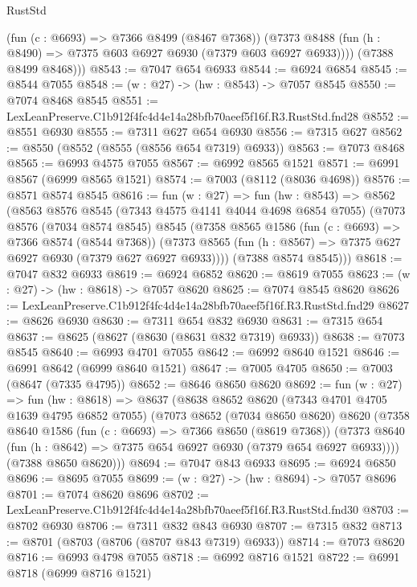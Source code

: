 \begin{lexlean}{RustStd}
\begin{coremodule}
          (fun (c : @6693) => @7366 @8499 (@8467 @7368))
          (@7373 @8488 (fun (h : @8490) => @7375 @603 @6927 @6930 (@7379 @603 @6927 @6933))))
        (@7388 @8499 @8468)))
@8543 := @7047 @654 @6933
@8544 := @6924 @6854
@8545 := @8544 @7055
@8548 := (w : @27) -> (hw : @8543) -> @7057 @8545
@8550 := @7074 @8468 @8545
@8551 := LexLeanPreserve.C1b912f4fc4d4e14a28bfb70aeef5f16f.R3.RustStd.fnd28
@8552 := @8551 @6930
@8555 := @7311 @627 @654 @6930
@8556 := @7315 @627
@8562 := @8550 (@8552 (@8555 (@8556 @654 @7319) @6933))
@8563 := @7073 @8468
@8565 := @6993 @4575 @7055
@8567 := @6992 @8565 @1521
@8571 := @6991 @8567 (@6999 @8565 @1521)
@8574 := @7003 (@8112 (@8036 @4698))
@8576 := @8571 @8574 @8545
@8616 := fun (w : @27) =>
  fun (hw : @8543) =>
  @8562
    (@8563
      @8576
      @8545
      (@7343 @4575 @4141 @4044 @4698 @6854 @7055)
      (@7073
        @8576
        (@7034 @8574 @8545)
        @8545
        (@7358
          @8565
          @1586
          (fun (c : @6693) => @7366 @8574 (@8544 @7368))
          (@7373 @8565 (fun (h : @8567) => @7375 @627 @6927 @6930 (@7379 @627 @6927 @6933))))
        (@7388 @8574 @8545)))
@8618 := @7047 @832 @6933
@8619 := @6924 @6852
@8620 := @8619 @7055
@8623 := (w : @27) -> (hw : @8618) -> @7057 @8620
@8625 := @7074 @8545 @8620
@8626 := LexLeanPreserve.C1b912f4fc4d4e14a28bfb70aeef5f16f.R3.RustStd.fnd29
@8627 := @8626 @6930
@8630 := @7311 @654 @832 @6930
@8631 := @7315 @654
@8637 := @8625 (@8627 (@8630 (@8631 @832 @7319) @6933))
@8638 := @7073 @8545
@8640 := @6993 @4701 @7055
@8642 := @6992 @8640 @1521
@8646 := @6991 @8642 (@6999 @8640 @1521)
@8647 := @7005 @4705
@8650 := @7003 (@8647 (@7335 @4795))
@8652 := @8646 @8650 @8620
@8692 := fun (w : @27) =>
  fun (hw : @8618) =>
  @8637
    (@8638
      @8652
      @8620
      (@7343 @4701 @4705 @1639 @4795 @6852 @7055)
      (@7073
        @8652
        (@7034 @8650 @8620)
        @8620
        (@7358
          @8640
          @1586
          (fun (c : @6693) => @7366 @8650 (@8619 @7368))
          (@7373 @8640 (fun (h : @8642) => @7375 @654 @6927 @6930 (@7379 @654 @6927 @6933))))
        (@7388 @8650 @8620)))
@8694 := @7047 @843 @6933
@8695 := @6924 @6850
@8696 := @8695 @7055
@8699 := (w : @27) -> (hw : @8694) -> @7057 @8696
@8701 := @7074 @8620 @8696
@8702 := LexLeanPreserve.C1b912f4fc4d4e14a28bfb70aeef5f16f.R3.RustStd.fnd30
@8703 := @8702 @6930
@8706 := @7311 @832 @843 @6930
@8707 := @7315 @832
@8713 := @8701 (@8703 (@8706 (@8707 @843 @7319) @6933))
@8714 := @7073 @8620
@8716 := @6993 @4798 @7055
@8718 := @6992 @8716 @1521
@8722 := @6991 @8718 (@6999 @8716 @1521)

\end{coremodule}
\end{lexlean}
